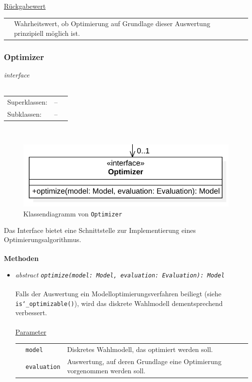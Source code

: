 \documentclass{article}
\begin{document}
\begin{itemize}
\begin{itemize}
\underline{Rückgabewert}\\
\begin{tabular}{lll}
 & Wahrheitswert, ob Optimierung auf Grundlage dieser Auswertung prinzipiell möglich ist.\\
\end{tabular}
\end{itemize}


\newpage
\subsubsection*{\large{\textbf{Optimizer}\label{cls:Optimizer}}}
\textit{\flqq{}interface\frqq}\normalsize\\\\
\begin{tabular}{lll}
 Superklassen: & --\\
 Subklassen: & --
\end{tabular}\\
\begin{figure}[H]%
    \centering
    \includegraphics[width=13cm]{entwurf/Entwurf_dokument/img/cls/model/Optimizer.png}
    \caption{Klassendiagramm von \texttt{Optimizer}}
\end{figure}

Das Interface bietet eine Schnittstelle zur Implementierung eines Optimierungsalgorithmus.
\\\\

\textbf{Methoden}
\begin{itemize}\setlength\itemsep{3em}
\item \textit{\flqq{}abstract\frqq} \texttt{\textit{optimize(model: Model, evaluation: Evaluation): Model}}\\\\
Falls der Auswertung ein Modelloptimierungsverfahren beiliegt (siehe \texttt{is\char`_optimizable()}), wird das diskrete Wahlmodell dementsprechend verbessert.\\\\
\underline{Parameter}\\
\begin{tabular}{lll}
 & \texttt{model} & Diskretes Wahlmodell, das optimiert werden soll.\\
 & \texttt{evaluation} & Auswertung, auf deren Grundlage eine Optimierung vorgenommen werden soll.
\end{tabular}


\end{itemize}
\end{itemize}
\end{document}
